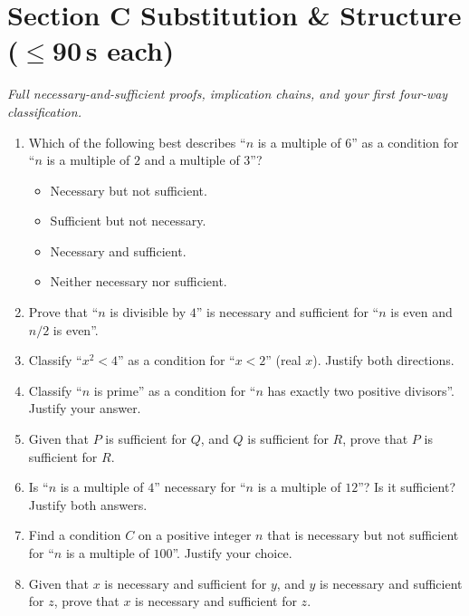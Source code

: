 \documentclass[11pt,a4paper]{article}
\begin{document}
\section*{Section C \quad Substitution \& Structure \hfill{\normalfont\small($\leq$90\,s each)}}

\noindent\textit{Full necessary-and-sufficient proofs, implication chains, and your first four-way classification.}

\begin{enumerate}

\item Which of the following best describes ``$n$ is a multiple of $6$'' as a condition for ``$n$ is a multiple of $2$ and a multiple of $3$''?
\begin{itemize}
\item[A)] Necessary but not sufficient.
\item[B)] Sufficient but not necessary.
\item[C)] Necessary and sufficient.
\item[D)] Neither necessary nor sufficient.
\end{itemize}

\item Prove that ``$n$ is divisible by $4$'' is necessary and sufficient for ``$n$ is even and $n/2$ is even''.

\item Classify ``$x^2<4$'' as a condition for ``$x<2$'' (real $x$). Justify both directions.

\item Classify ``$n$ is prime'' as a condition for ``$n$ has exactly two positive divisors''. Justify your answer.

\item Given that $P$ is sufficient for $Q$, and $Q$ is sufficient for $R$, prove that $P$ is sufficient for $R$.

\item Is ``$n$ is a multiple of $4$'' necessary for ``$n$ is a multiple of $12$''? Is it sufficient? Justify both answers.

\item Find a condition $C$ on a positive integer $n$ that is necessary but not sufficient for ``$n$ is a multiple of $100$''. Justify your choice.

\item Given that $x$ is necessary and sufficient for $y$, and $y$ is necessary and sufficient for $z$, prove that $x$ is necessary and sufficient for $z$.

\end{enumerate}
\end{document}
